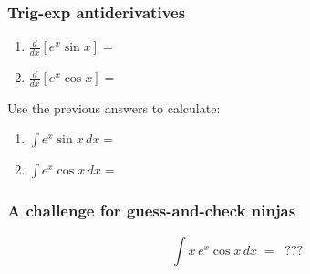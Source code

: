 \documentclass[14pt]{beamer}
\begin{document}
	\begin{frame}[t]
		\frametitle{Trig-exp antiderivatives}

		\begin{enumerate}
			\item $\displaystyle \frac{d}{dx}\left[ e^{x}\sin x \right]=$
				\vspace{.1cm}
				\vspace{.1cm}

			\item $\displaystyle \frac{d}{dx}\left[ e^{x}\cos x \right]=$
		\end{enumerate}
		\vspace{.5cm}
		Use the previous answers to calculate:
		\vspace{.3cm}
		\begin{enumerate}
			\addtocounter{enumi}{2}

			\item $\displaystyle \int e^{x}\sin x \, dx =$
				\vspace{.1cm}
				\vspace{.1cm}

			\item $\displaystyle \int e^{x}\cos x \, dx =$
		\end{enumerate}
	\end{frame}

	\begin{frame}[t]
		\frametitle{A challenge for guess-and-check ninjas}
		\[
			\int x \, e^{x}\cos x \, dx \; = \; \; ???
		\]
	\end{frame}




\end{document}
